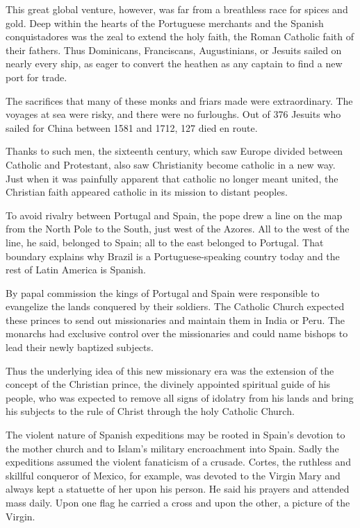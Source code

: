 This great global venture, however, was far from a breathless race for spices and gold. Deep within
the hearts of the Portuguese merchants and the Spanish conquistadores was the zeal to extend the
holy faith, the Roman Catholic faith of their fathers. Thus Dominicans, Franciscans, Augustinians,
or Jesuits sailed on nearly every ship, as eager to convert the heathen as any captain to find a new
port for trade.

The sacrifices that many of these monks and friars made were extraordinary. The voyages at sea were
risky, and there were no furloughs. Out of 376 Jesuits who sailed for China between 1581 and 1712,
127 died en route.

Thanks to such men, the sixteenth century, which saw Europe divided between Catholic and Protestant,
also saw Christianity become catholic in a new way. Just when it was painfully apparent that
catholic no longer meant united, the Christian faith appeared catholic in its mission to distant
peoples.

To avoid rivalry between Portugal and Spain, the pope drew a line on the map from the North Pole to
the South, just west of the Azores. All to the west of the line, he said, belonged to Spain; all to
the east belonged to Portugal. That boundary explains why Brazil is a Portuguese-speaking country
today and the rest of Latin America is Spanish.

By papal commission the kings of Portugal and Spain were responsible to evangelize the lands
conquered by their soldiers. The Catholic Church expected these princes to send out missionaries and
maintain them in India or Peru. The monarchs had exclusive control over the missionaries and could
name bishops to lead their newly baptized subjects.

Thus the underlying idea of this new missionary era was the extension of the concept of the
Christian prince, the divinely appointed spiritual guide of his people, who was expected to remove
all signs of idolatry from his lands and bring his subjects to the rule of Christ through the holy
Catholic Church.

The violent nature of Spanish expeditions may be rooted in Spain’s devotion to the mother church and
to Islam’s military encroachment into Spain. Sadly the expeditions assumed the violent fanaticism of
a crusade. Cortes, the ruthless and skillful conqueror of Mexico, for example, was devoted to the
Virgin Mary and always kept a statuette of her upon his person. He said his prayers and attended
mass daily. Upon one flag he carried a cross and upon the other, a picture of the Virgin.

